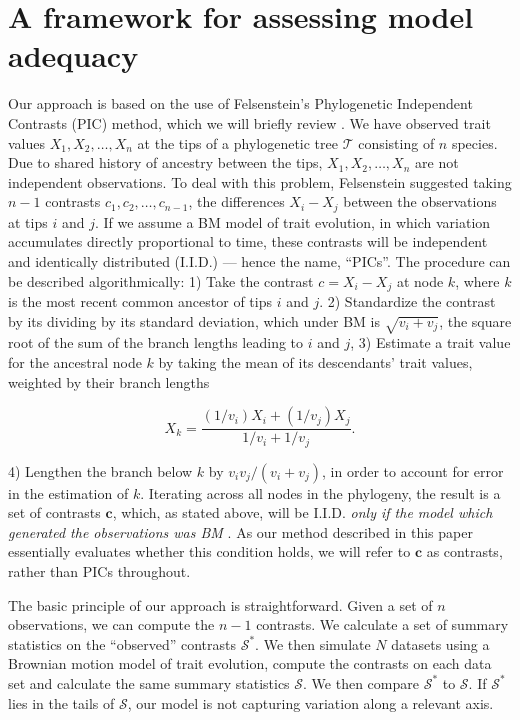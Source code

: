 \documentclass[a4paper,12pt]{article}
\begin{document}
\section*{A framework for assessing model adequacy}

Our approach is based on the use of Felsenstein's \citep{Felsenstein1973, Felsenstein1985} Phylogenetic Independent Contrasts (PIC) method, which we will briefly review \citep[for more details, see][]{Felsenstein1985, Rohlf2001, Blomberg2012}. We have observed trait values $X_1, X_2, \ldots, X_n$ at the tips of a phylogenetic tree $\mathcal{T}$ consisting of $n$ species. Due to shared history of ancestry between the tips, $X_1, X_2, \ldots, X_n$ are not independent observations. To deal with this problem, Felsenstein suggested taking $n-1$ contrasts $c_1, c_2, \ldots, c_{n-1}$, the differences $X_{i} - X_{j}$ between the observations at tips $i$ and $j$. If we assume a BM model of trait evolution, in which variation accumulates directly proportional to time, these contrasts will be independent and identically distributed (I.I.D.) --- hence the name, ``PICs''. The procedure can be described algorithmically: 1) Take the contrast $c = X_i - X_j$ at node $k$, where $k$ is the most recent common ancestor of tips $i$ and $j$. 2) Standardize the contrast by its dividing by its standard deviation, which under BM is $\sqrt{v_i + v_j}$, the square root of the sum of the branch lengths leading to $i$ and $j$, 3) Estimate a trait value for the ancestral node $k$ by taking the mean of its descendants' trait values, weighted by their branch lengths

\begin{equation}
X_k = \frac{(1 / v_i)X_i + (1 / v_j)X_j}{1/v_i + 1/v_j}.
\end{equation}

4) Lengthen the branch below $k$ by $v_i v_j / (v_i + v_j)$, in order to account for error in the estimation of $k$. Iterating across all nodes in the phylogeny, the result is a set of contrasts $\mathbf{c}$, which, as stated above, will be I.I.D. \textit{only if the model which generated the observations was BM} \citep{Rohlf2001}. As our method described in this paper essentially evaluates whether this condition holds, we will refer to $\mathbf{c}$ as contrasts, rather than PICs throughout.

The basic principle of our approach is straightforward. Given a set of $n$ observations, we can compute the $n-1$ contrasts. We calculate a set of summary statistics on the ``observed'' contrasts $\mathcal{S}^*$. We then simulate $N$ datasets using a Brownian motion model of trait evolution, compute the contrasts on each data set and calculate the same summary statistics $\mathcal{S}$. We then compare $\mathcal{S}^*$ to $\mathcal{S}$. If $\mathcal{S}^*$ lies in the tails of $\mathcal{S}$, our model is not capturing variation along a relevant axis.
\end{document}
